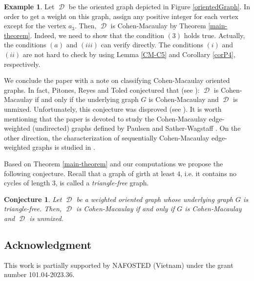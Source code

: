\documentclass[12pt, amscd]{amsart}
\newtheorem{conj}[thm]{Conjecture}
\theoremstyle{definition}
\newtheorem{exm}[thm]{Example}
\DeclareMathOperator{\D}{\mathcal{D}}
\newcommand{\0}{\bold{0}}
\begin{document}
\begin{exm}Let $\D$ be the oriented graph depicted in Figure \ref{orientedGraph}. In order to get a weight on this graph, assign any positive integer for each vertex except for the vertex $a_3$. Then, $\D$ is Cohen-Macaulay by Theorem \ref{main-theorem}.  Indeed, we need to show that the condition $(3)$ holds true. Actually, the conditions $(a)$ and $(iii)$ can verify directly. The conditions $(i)$ and $(ii)$ are not hard to check by using  Lemma \ref{CM-C5} and Corollary \ref{corP4}, respectively.
\end{exm}


We conclude the paper with a note on classifying Cohen-Macaulay oriented graphs.  In fact, Pitones, Reyes and Toled \cite{PRT} conjectured that (see \cite[Conjecture 53]{PRT}): $\D$ is Cohen-Macaulay if and only if the underlying graph $G$ is Cohen-Macaulay and $\D$ is unmixed. Unfortunately, this conjecture was disproved (see \cite[Section 4]{SSTY}). It is worth mentioning that the paper \cite{SSTY} is devoted to study the Cohen-Macaulay edge-weighted (undirected) graphs defined by Paulsen and Sather-Wagstaff  \cite{PS}. On the other direction, the characterization of sequentially Cohen-Macaulay edge-weighted graphs is studied in \cite{MDV}.

\medskip

Based on Theorem \ref{main-theorem} and our computations we propose the following conjecture. Recall that a graph of girth at least $4$, i.e. it contains no cycles of length $3$, is called a {\it triangle-free} graph.

\begin{conj} Let $\D$ be a weighted oriented graph whose underlying graph $G$ is triangle-free. Then, $\D$ is Cohen-Macaulay if and only if $G$ is Cohen-Macaulay and $\D$ is unmixed.
\end{conj}

\subsection*{Acknowledgment}  This work is  partially supported by NAFOSTED (Vietnam) under the grant number 101.04-2023.36.
\end{document}
